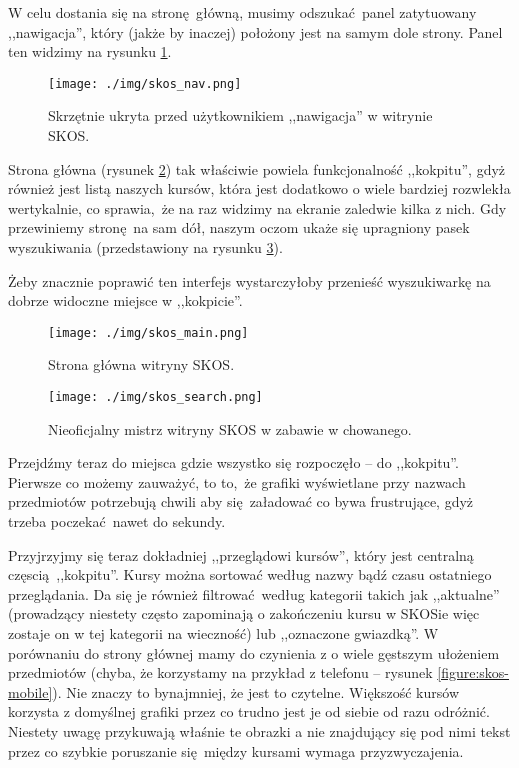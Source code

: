 \documentclass[12pt, a4paper, oneside]{report}
\begin{document}
W celu dostania się na stronę główną, musimy odszukać panel zatytuowany 
,,nawigacja'', który (jakże by inaczej) położony jest na samym dole strony.
Panel ten widzimy na rysunku \ref{figure:skos-nav}.

\begin{figure}[H]
    \centering
    \texttt{[image: ./img/skos\_nav.png]}
    \caption{Skrzętnie ukryta przed użytkownikiem 
             ,,nawigacja'' w witrynie SKOS.}
    \label{figure:skos-nav}
\end{figure}

Strona główna (rysunek \ref{figure:skos-main}) tak właściwie powiela 
funkcjonalność ,,kokpitu'', gdyż również jest listą naszych kursów, która jest 
dodatkowo o wiele bardziej rozwlekła wertykalnie, co sprawia, że na raz widzimy 
na ekranie zaledwie kilka z nich. Gdy przewiniemy stronę na sam dół, naszym
oczom ukaże się upragniony pasek wyszukiwania (przedstawiony na rysunku \ref{figure:skos-search}).

Żeby znacznie poprawić ten interfejs wystarczyłoby przenieść wyszukiwarkę na 
dobrze widoczne miejsce w ,,kokpicie''.

\begin{figure}[H]
    \centering
    \texttt{[image: ./img/skos\_main.png]}
    \caption{Strona główna witryny SKOS.}
    \label{figure:skos-main}
\end{figure}


\begin{figure}[H]
    \centering
    \texttt{[image: ./img/skos\_search.png]}
    \caption{Nieoficjalny mistrz witryny SKOS w zabawie w chowanego.}
    \label{figure:skos-search}
\end{figure}


Przejdźmy teraz do miejsca gdzie wszystko się rozpoczęło -- do ,,kokpitu''.
Pierwsze co możemy zauważyć, to to, że grafiki wyświetlane przy nazwach
przedmiotów potrzebują chwili aby się załadować co bywa frustrujące, gdyż
trzeba poczekać nawet do sekundy.

Przyjrzyjmy się teraz dokładniej ,,przeglądowi kursów'', który jest centralną
częscią ,,kokpitu''. Kursy można sortować według nazwy bądź czasu ostatniego
przeglądania. Da się je również filtrować według kategorii takich jak 
,,aktualne'' (prowadzący niestety często zapominają o zakończeniu kursu w
SKOSie więc zostaje on w tej kategorii na wieczność) lub ,,oznaczone gwiazdką''.
W porównaniu do strony głównej mamy do czynienia z o wiele gęstszym ułożeniem
przedmiotów (chyba, że korzystamy na przykład z telefonu -- 
rysunek \ref{figure:skos-mobile}). Nie znaczy to bynajmniej, że jest to
czytelne. Większość kursów korzysta z domyślnej grafiki przez co trudno jest
je od siebie od razu odróżnić. Niestety uwagę przykuwają właśnie te obrazki a
nie znajdujący się pod nimi tekst przez co szybkie poruszanie się między kursami
wymaga przyzwyczajenia.
\end{document}
